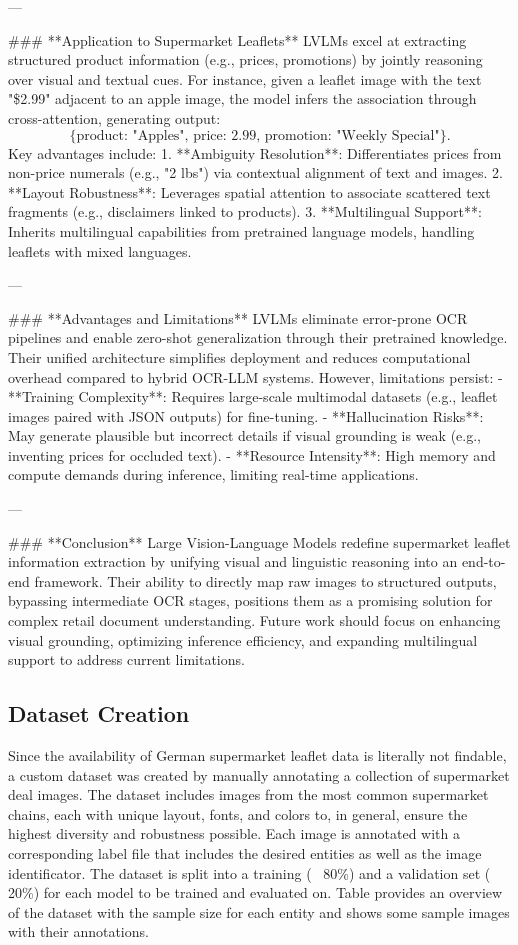 \documentclass[11pt]{article}
\begin{document}
---

### **Application to Supermarket Leaflets**  
LVLMs excel at extracting structured product information (e.g., prices, promotions) by jointly reasoning over visual and textual cues. For instance, given a leaflet image with the text "\$2.99" adjacent to an apple image, the model infers the association through cross-attention, generating output:  
\[
\{\text{product: "Apples", price: 2.99, promotion: "Weekly Special"}\}.
\]  
Key advantages include:  
1. **Ambiguity Resolution**: Differentiates prices from non-price numerals (e.g., "2 lbs") via contextual alignment of text and images.  
2. **Layout Robustness**: Leverages spatial attention to associate scattered text fragments (e.g., disclaimers linked to products).  
3. **Multilingual Support**: Inherits multilingual capabilities from pretrained language models, handling leaflets with mixed languages.

---

### **Advantages and Limitations**  
LVLMs eliminate error-prone OCR pipelines and enable zero-shot generalization through their pretrained knowledge. Their unified architecture simplifies deployment and reduces computational overhead compared to hybrid OCR-LLM systems. However, limitations persist:  
- **Training Complexity**: Requires large-scale multimodal datasets (e.g., leaflet images paired with JSON outputs) for fine-tuning.  
- **Hallucination Risks**: May generate plausible but incorrect details if visual grounding is weak (e.g., inventing prices for occluded text).  
- **Resource Intensity**: High memory and compute demands during inference, limiting real-time applications.  

---

### **Conclusion**  
Large Vision-Language Models redefine supermarket leaflet information extraction by unifying visual and linguistic reasoning into an end-to-end framework. Their ability to directly map raw images to structured outputs, bypassing intermediate OCR stages, positions them as a promising solution for complex retail document understanding. Future work should focus on enhancing visual grounding, optimizing inference efficiency, and expanding multilingual support to address current limitations.

\subsection{Dataset Creation}
Since the availability of German supermarket leaflet data is literally not findable, a custom dataset was created by manually annotating a collection of supermarket deal images. The dataset includes images from the most common supermarket chains, each with unique layout, fonts, and colors to, in general, ensure the highest diversity and robustness possible. Each image is annotated with a corresponding label file that includes the desired entities as well as the image identificator. The dataset is split into a training (~ 80\%) and a validation set (~ 20\%) for each model to be trained and evaluated on. Table  provides an overview of the dataset with the sample size for each entity and  shows some sample images with their annotations.
\end{document}
